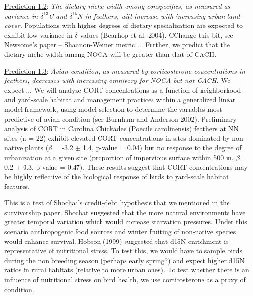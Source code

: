 \documentclass[12pt]{article}
\begin{document}

\noindent \underline{Prediction 1.2}: \textit{ The dietary niche width among conspecifics, as measured as variance in $\delta^{13}$C and $\delta^{15}$N in feathers,  will increase with increasing urban land cover.} Populations with higher degrees of dietary specialization are expected to exhibit low variance in $\delta$-values (Bearhop et al. 2004). CChange this bit, see Newsome's paper -- Shannon-Weiner metric ... Further, we predict that the dietary niche width among NOCA will be greater than that of CACH. \par


\noindent \underline{Prediction 1.3}: \textit{Avian condition, as measured by corticosterone concentrations in feathers, decreases with increasing omnivory for NOCA but not CACH.} We expect ...  We will analyze CORT concentrations as a function of neighborhood and yard-scale habitat and management practices within a generalized linear model framework, using model selection to determine the variables most predictive of avian condition (see Burnham and Anderson 2002). Preliminary analysis of CORT in Carolina Chickadee (Poecile carolinensis) feathers at NN sites (n = 22) exhibit elevated CORT concentrations in sites dominated by non-native plants ($\beta$ = -3.2 $\pm$ 1.4, p-value = 0.04) but no response to the degree of urbanization at a given site (proportion of impervious surface within 500 m, $\beta$ = 0.2 $\pm$ 0.3, p-value = 0.47). These results suggest that CORT concentrations may be highly reflective of the biological response of birds to yard-scale habitat features.\par


 This is a test of Shochat’s credit-debt hypothesis that we mentioned in the survivorship paper. Shochat suggested that the more natural environments have greater temporal variation which would increase starvation pressures. Under this scenario anthropogenic food sources and winter fruiting of non-native species would enhance survival. Hobson (1999) suggested that d15N enrichment is representative of nutritional stress. To test this, we would have to sample birds during the non breeding season (perhaps early spring?) and expect higher d15N ratios in rural habitats (relative to more urban ones). To test whether there is an influence of nutritional stress on bird health, we use corticosterone as a proxy of condition. \par
\end{document}
